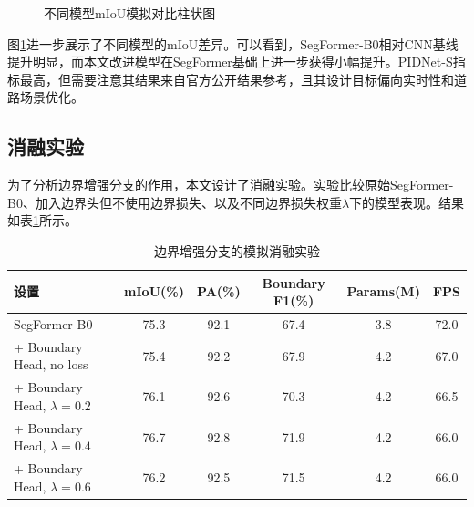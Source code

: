 \documentclass{report}
\begin{document}
\begin{figure}[H]
\centering
{}
\caption{不同模型mIoU模拟对比柱状图}
\label{fig:miou_bar}
\end{figure}

图\ref{fig:miou_bar}进一步展示了不同模型的mIoU差异。可以看到，SegFormer-B0相对CNN基线提升明显，而本文改进模型在SegFormer基础上进一步获得小幅提升。PIDNet-S指标最高，但需要注意其结果来自官方公开结果参考，且其设计目标偏向实时性和道路场景优化。

\subsection{消融实验}

为了分析边界增强分支的作用，本文设计了消融实验。实验比较原始SegFormer-B0、加入边界头但不使用边界损失、以及不同边界损失权重$\lambda$下的模型表现。结果如表\ref{tab:ablation}所示。

\begin{table}[H]
\centering
\caption{边界增强分支的模拟消融实验}
\label{tab:ablation}
\begin{tabular}{lccccc}
\toprule
设置 & mIoU(\%) & PA(\%) & Boundary F1(\%) & Params(M) & FPS \\
\midrule
SegFormer-B0 & 75.3 & 92.1 & 67.4 & 3.8 & 72.0 \\
+ Boundary Head, no loss & 75.4 & 92.2 & 67.9 & 4.2 & 67.0 \\
+ Boundary Head, $\lambda=0.2$ & 76.1 & 92.6 & 70.3 & 4.2 & 66.5 \\
+ Boundary Head, $\lambda=0.4$ & 76.7 & 92.8 & 71.9 & 4.2 & 66.0 \\
+ Boundary Head, $\lambda=0.6$ & 76.2 & 92.5 & 71.5 & 4.2 & 66.0 \\
\bottomrule
\end{tabular}
\end{table}
\end{document}
